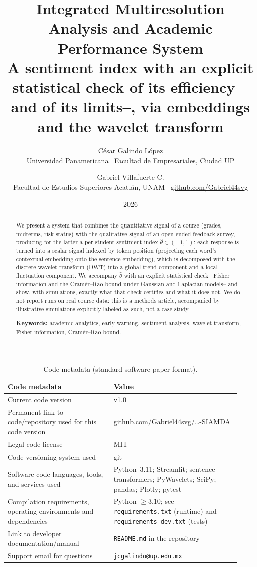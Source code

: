 \documentclass[11pt,a4paper,oneside]{article}
\title{\vspace{-1.5cm}\textbf{\Large Integrated Multiresolution Analysis and Academic Performance System}\\[2pt]
\large A sentiment index with an explicit statistical check of its efficiency --and of its limits--, via embeddings and the wavelet transform}
\author{C\'esar Galindo L\'opez \\ \small Universidad Panamericana \textperiodcentered\ Facultad de Empresariales, Ciudad UP
  \and Gabriel Villafuerte C. \\ \small Facultad de Estudios Superiores Acatl\'an, UNAM \textperiodcentered\
  \href{https://github.com/Gabriel44svg}{github.com/Gabriel44svg}}
\date{\small 2026}
\theoremstyle{definition}
\begin{document}
\maketitle

\begin{abstract}
\noindent We present a system that combines the quantitative signal of a course (grades,
midterms, risk status) with the qualitative signal of an open-ended feedback survey, producing
for the latter a per-student sentiment index $\hat\theta\in(-1,1)$: each response is turned into
a scalar signal indexed by token position (projecting each word's contextual embedding onto the
sentence embedding), which is decomposed with the discrete wavelet transform (DWT) into a
global-trend component and a local-fluctuation component. We accompany $\hat\theta$ with an
explicit statistical check --Fisher information and the Cram\'er--Rao bound under Gaussian and
Laplacian models-- and show, with simulations, exactly what that check certifies and what it
does not. We do not report runs on real course data: this is a methods article, accompanied by
illustrative simulations explicitly labeled as such, not a case study.

\medskip
\noindent\textbf{Keywords:} academic analytics, early warning, sentiment analysis, wavelet
transform, Fisher information, Cram\'er--Rao bound.
\end{abstract}

\begin{table}[h]
\centering
\small
\begin{tabular}{@{}p{0.42\linewidth}p{0.5\linewidth}@{}}
\toprule
\textbf{Code metadata} & \textbf{Value} \\
\midrule
Current code version & v1.0 \\
Permanent link to code/repository used for this code version &
  \href{https://github.com/Gabriel44svg/Galindo-C.-J.-y-Villafuerte-C.-G.-2026-.-SIAMDA}{github.com/Gabriel44svg/\ldots-SIAMDA} \\
Legal code license & MIT \\
Code versioning system used & git \\
Software code languages, tools, and services used &
  Python~3.11; Streamlit; sentence-transformers; PyWavelets; SciPy; pandas; Plotly; pytest \\
Compilation requirements, operating environments and dependencies &
  Python $\ge 3.10$; see \texttt{requirements.txt} (runtime) and \texttt{requirements-dev.txt}
  (tests) \\
Link to developer documentation/manual &
  \texttt{README.md} in the repository \\
Support email for questions & \texttt{jcgalindo@up.edu.mx} \\
\bottomrule
\end{tabular}
\caption{Code metadata (standard software-paper format).}
\label{tab:metadata}
\end{table}
\end{document}
